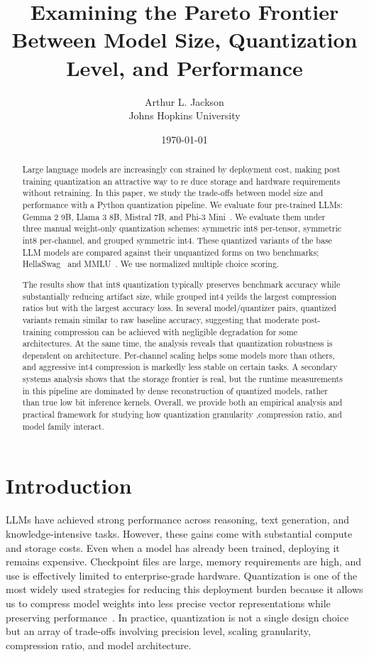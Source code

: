 \documentclass[11pt,twocolumn]{article}
\title{Examining the Pareto Frontier Between Model Size, Quantization Level, and Performance}
\author{Arthur L. Jackson \\ Johns Hopkins University}
\date{\today}
\begin{document}
\maketitle

\begin{abstract}
Large language models are increasingly con strained by deployment cost, making post training quantization an attractive way to re duce storage and hardware requirements without retraining. In this paper, we study the trade-offs between model size and performance with a Python quantization pipeline. We evaluate four pre-trained LLMs: Gemma 2 9B, Llama 3 8B, Mistral 7B, and Phi-3 Mini~\cite{gemma2,llama3herd,jiang2023mistral,abdin2024phi3}. We evaluate them under three manual weight-only quantization schemes: symmetric int8 per-tensor, symmetric int8 per-channel, and grouped symmetric int4. These quantized variants of the base LLM models are compared against their unquantized forms on two benchmarks; HellaSwag~\cite{zellers2019hellaswag} and MMLU~\cite{hendrycks2021mmlu}. We use normalized multiple choice scoring. 

The results show that int8 quantization typically preserves benchmark accuracy while substantially reducing artifact size, while grouped int4 yeilds the largest compression ratios but with the largest accuracy loss. In several model/quantizer pairs, quantized variants remain similar to raw baseline accuracy, suggesting that moderate post-training compression can be achieved with negligible degradation for some architectures. At the same time, the analysis reveals that quantization robustness is dependent on architecture. Per-channel scaling helps some models more than others, and aggressive int4 compression is markedly less stable on certain tasks. A secondary systems analysis shows that the storage frontier is real, but the runtime measurements in this pipeline are dominated by dense reconstruction of quantized models, rather than true low bit inference kernels. Overall, we provide both an empirical analysis and practical framework  for studying how quantization granularity ,compression ratio, and model family interact. 
\end{abstract}

\section{Introduction}
LLMs  have achieved strong performance across reasoning, text generation, and knowledge-intensive tasks. However, these gains come with substantial compute and storage costs. Even when a model has already been trained, deploying it remains expensive. Checkpoint files are large, memory requirements are high, and use is effectively limited to enterprise-grade hardware. Quantization is one of the most widely used strategies for reducing this deployment burden because it allows us to compress model weights into less precise vector representations while preserving performance~\cite{cheng2017compression,gholami2021surveyquantization,zhu2023llmcompression}. In practice, quantization is not a single design choice but an array of trade-offs involving precision level, scaling granularity, compression ratio, and model architecture.
\end{document}
